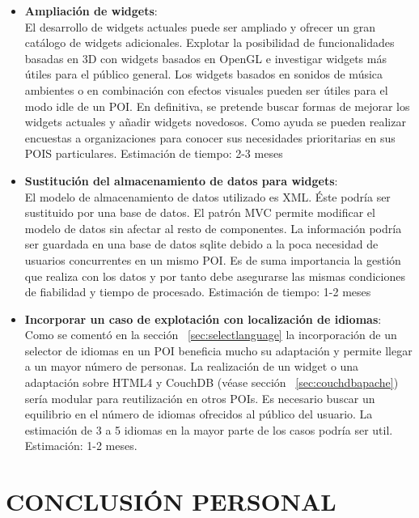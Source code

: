 \begin{itemize}
     \item \textbf{Ampliación de widgets}:\\
     El desarrollo de widgets actuales puede ser ampliado y ofrecer un gran catálogo
    de widgets adicionales. Explotar la posibilidad de funcionalidades basadas
    en 3D con widgets basados en OpenGL e investigar widgets más útiles para
    el público general. Los widgets basados en sonidos de música ambientes o
    en combinación con efectos visuales pueden ser útiles para el modo idle de
    un POI. En definitiva, se pretende buscar formas de mejorar los widgets
    actuales y añadir widgets novedosos. Como ayuda se pueden realizar 
    encuestas a organizaciones para conocer sus necesidades prioritarias 
    en sus POIS particulares. 
    Estimación de tiempo: 2-3 meses
    
    \item \textbf{Sustitución del almacenamiento de datos para widgets}:\\
    El modelo de almacenamiento de datos utilizado es XML.
    Éste podría ser sustituido por una base de datos. El patrón MVC permite 
    modificar el modelo de datos sin afectar al resto de componentes. La
    información podría ser guardada en una base de datos sqlite debido a la poca
    necesidad de usuarios concurrentes en un mismo POI. Es de suma importancia
    la gestión que realiza con los datos y por tanto debe asegurarse las mismas
    condiciones de fiabilidad y tiempo de procesado. 
    Estimación de tiempo: 1-2 meses
    
    \item \textbf{Incorporar un caso de explotación con localización de
    idiomas}:\\
    Como se comentó en la sección ~\ref{sec:selectlanguage} la incorporación de
    un selector de idiomas en un POI beneficia mucho su adaptación y permite llegar a
    un mayor número de personas.
    La realización de un widget o una adaptación sobre HTML4 y CouchDB (véase
    sección ~\ref{sec:couchdbapache}) sería modular para reutilización en otros
    POIs. Es necesario buscar un equilibrio en el número de idiomas ofrecidos al
    público del usuario. La estimación de 3 a 5 idiomas en la mayor parte de los
    casos podría ser util.
    Estimación: 1-2 meses.

\end{itemize}

\newpage

\section{\uppercase{Conclusión personal}}

